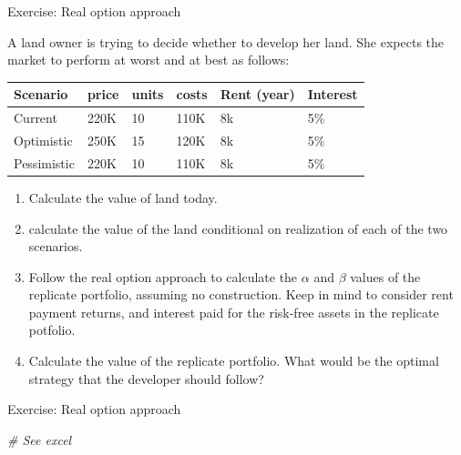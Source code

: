 \documentclass[ignorenonframetext,]{beamer}
\newenvironment{Shaded}{\begin{snugshade}}{\end{snugshade}}
\newcommand{\CommentTok}[1]{\textcolor[rgb]{0.56,0.35,0.01}{\textit{{#1}}}}
\providecommand{\tightlist}{%
\setlength{\itemsep}{0pt}\setlength{\parskip}{0pt}}
\begin{document}
\begin{frame}{Exercise: Real option approach}

\footnotesize

A land owner is trying to decide whether to develop her land. She
expects the market to perform at worst and at best as follows:

\begin{longtable}[]{@{}llllll@{}}
\toprule
Scenario & price & units & costs & Rent (year) & Interest\tabularnewline
\midrule
\endhead
Current & 220K & 10 & 110K & 8k & 5\%\tabularnewline
Optimistic & 250K & 15 & 120K & 8k & 5\%\tabularnewline
Pessimistic & 220K & 10 & 110K & 8k & 5\%\tabularnewline
\bottomrule
\end{longtable}

\begin{enumerate}
\def\labelenumi{\arabic{enumi}.}
\tightlist
\item
  Calculate the value of land today.
\item
  calculate the value of the land conditional on realization of each of
  the two scenarios.
\item
  Follow the real option approach to calculate the \(\alpha\) and
  \(\beta\) values of the replicate portfolio, assuming no construction.
  Keep in mind to consider rent payment returns, and interest paid for
  the risk-free assets in the replicate potfolio.
\item
  Calculate the value of the replicate portfolio. What would be the
  optimal strategy that the developer should follow?
\end{enumerate}

\normalsize

\end{frame}

\begin{frame}[fragile]{Exercise: Real option approach}

\begin{Shaded}
\begin{Highlighting}[]
\CommentTok{# See excel}
\end{Highlighting}
\end{Shaded}

\end{frame}
\end{document}
